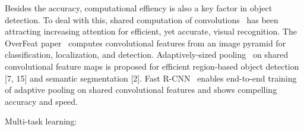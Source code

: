 Besides the accuracy, computational effiency is also a key factor in object detection. To deal with this, shared computation of convolutions~\cite{sermanet2013overfeat, he2014spatial, ren2015faster, long2015fully} has been attracting increasing attention for efficient, yet accurate, visual recognition. The OverFeat paper~\cite{sermanet2013overfeat} computes convolutional features from an image pyramid for classification, localization, and detection. Adaptively-sized pooling~\cite{he2014spatial} on shared convolutional feature maps is proposed for efficient region-based object detection [7, 15] and semantic segmentation [2]. Fast R-CNN~\cite{ren2015faster} enables end-to-end training of adaptive pooling on shared convolutional features and shows compelling accuracy and speed.


Multi-task learning:
